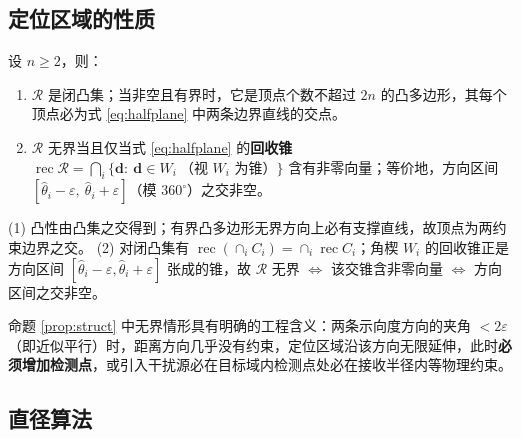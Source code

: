 \subsection{定位区域的性质}

\begin{proposition}[结构性]\label{prop:struct}
设 $n\ge2$，则：
\begin{enumerate}
  \item $\mathcal{R}$ 是闭凸集；当非空且有界时，它是顶点个数不超过 $2n$ 的凸多边形，其每个顶点必为式 \eqref{eq:halfplane} 中两条边界直线的交点。
  \item $\mathcal{R}$ 无界当且仅当式 \eqref{eq:halfplane} 的\textbf{回收锥}
  $\operatorname{rec}\mathcal{R}=\bigcap_i\{\mathbf d:\ \mathbf d\in W_i\ \text{（视 $W_i$ 为锥）}\}$
  含有非零向量；等价地，方向区间
  $[\hat\theta_i-\varepsilon,\ \hat\theta_i+\varepsilon]$（模 $360^{\circ}$）之交非空。
\end{enumerate}
\end{proposition}

\begin{pf}
(1) 凸性由凸集之交得到；有界凸多边形无界方向上必有支撑直线，故顶点为两约束边界之交。
(2) 对闭凸集有 $\operatorname{rec}(\cap_i C_i)=\cap_i\operatorname{rec}C_i$；角楔 $W_i$ 的回收锥正是方向区间 $[\hat\theta_i-\varepsilon,\hat\theta_i+\varepsilon]$ 张成的锥，故 $\mathcal{R}$ 无界 $\iff$ 该交锥含非零向量 $\iff$ 方向区间之交非空。
\end{pf}

命题 \ref{prop:struct} 中无界情形具有明确的工程含义：两条示向度方向的夹角 $<2\varepsilon$（即近似平行）时，距离方向几乎没有约束，定位区域沿该方向无限延伸，此时\textbf{必须增加检测点}，或引入干扰源必在目标域内检测点处必在接收半径内等物理约束。

\subsection{直径算法}

